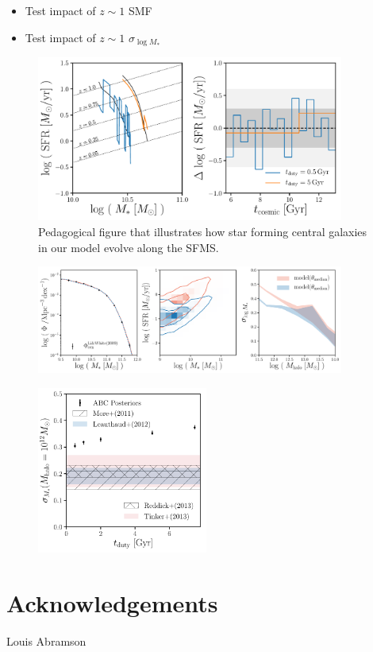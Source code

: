 \documentclass[12pt, letterpaper, preprint]{aastex}
\newcommand{\bitem}{\begin{itemize}}
\newcommand{\eitem}{\end{itemize}}
\begin{document}
\bitem
\item Test impact of $z \sim 1$ SMF
\item Test impact of $z \sim 1$ $\sigma_{\log M_*}$ 
\eitem

\begin{figure}
\begin{center}
\includegraphics[width=0.9\textwidth]{figs/sfh_pedagogical.pdf}
\caption{Pedagogical figure that illustrates how star forming central galaxies in our model
evolve along the SFMS.}
\label{fig:sfh_model}
\end{center}
\end{figure}

\begin{figure}
\begin{center}
\includegraphics[width=0.9\textwidth]{figs/qaplot_abc.pdf}
\caption{}
\label{fig:abc_demo}
\end{center}
\end{figure}

\begin{figure}
\begin{center}
\includegraphics[width=0.5\textwidth]{figs/sigMstar_tduty.pdf}
\caption{}
\label{fig:abc_demo}
\end{center}
\end{figure}

\section*{Acknowledgements}
Louis Abramson



\end{document}
